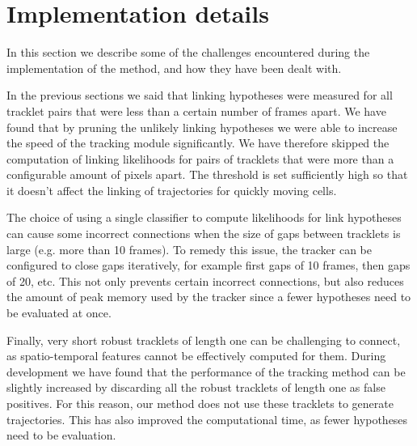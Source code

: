 	  \section{Implementation details}
		\label{sec:tracking_implementation}
	  	In this section we describe some of the challenges encountered during the implementation of the method, and how they have been dealt with.
	  		  	
	  	In the previous sections we said that linking hypotheses were measured for all tracklet pairs that were less than a certain number of frames apart. We have found that by pruning the unlikely linking hypotheses we were able to increase the speed of the tracking module significantly. We have therefore skipped the computation of linking likelihoods for pairs of tracklets that were more than a configurable amount of pixels apart. The threshold is set sufficiently high so that it doesn't affect the linking of trajectories for quickly moving cells.
	  	
	  	The choice of using a single classifier to compute likelihoods for link hypotheses can cause some incorrect connections when the size of gaps between tracklets is large (e.g. more than 10 frames). To remedy this issue, the tracker can be configured to close gaps iteratively, for example first gaps of 10 frames, then gaps of 20, etc. This not only prevents certain incorrect connections, but also reduces the amount of peak memory used by the tracker since a fewer hypotheses need to be evaluated at once.
	  	
	  	Finally, very short robust tracklets of length one can be challenging to connect, as spatio-temporal features cannot be effectively computed for them. During development we have found that the performance of the tracking method can be slightly increased by discarding all the robust tracklets of length one as false positives. For this reason, our method does not use these tracklets to generate trajectories. This has also improved the computational time, as fewer hypotheses need to be evaluation.